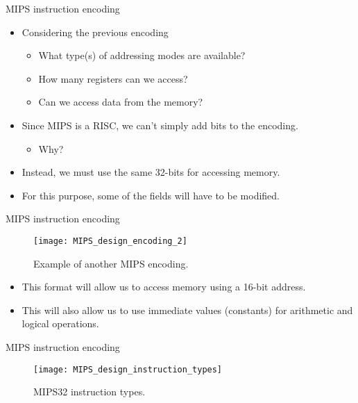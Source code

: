 \documentclass[]{slides}
\begin{document}
% 
\begin{frame}{\acs{MIPS} instruction encoding}
    \begin{itemize}
    \item Considering the previous encoding
    \begin{itemize}
    \item What type(s) of addressing modes are available?
    \item How many registers can we access?
    \item Can we access data from the memory?
    \end{itemize}
    \pauseprint
    \item Since \ac{MIPS} is a \ac{RISC}, we can't simply add bits to the encoding.
    \begin{itemize}
    \item Why?
        \pauseprint
    \end{itemize}
    \item Instead, we must use the same 32-bits for accessing memory.
    \item For this purpose, some of the fields will have to be modified.
  \end{itemize}
\end{frame}

% 
\begin{frame}{\acs{MIPS} instruction encoding}
  \begin{figure}
  \centering
  \texttt{[image: MIPS\_design\_encoding\_2]}
  \caption{Example of another \acs{MIPS} encoding.}
  \label{Figure:MIPS32_encoding_2}
  \end{figure}
  \begin{itemize}
  \item This format will allow us to access memory using a 16-bit address.
  \item This will also allow us to use immediate values (constants) for arithmetic and logical operations.
  \end{itemize}
\end{frame}

% 
\begin{frame}{\acs{MIPS} instruction encoding}
  \begin{figure}
  \centering
  \texttt{[image: MIPS\_design\_instruction\_types]}
  \caption{\acs{MIPS}32 instruction types.}
  \label{Figure:MIPS32_instruction_types}
  \end{figure}
\end{frame}
\end{document}
